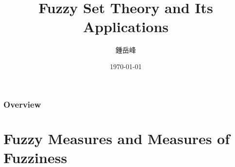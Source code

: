 \documentclass{beamer}
\begin{document}
\begin{CJK*}{UTF8}{bsmi}


\title[Fuzzy Set Theory]{Fuzzy Set Theory and Its Applications} %

\author{鍾岳峰} %
\date{\today} %



\begin{frame}
\titlepage %
\end{frame}

\begin{frame}
\frametitle{Overview} %
\tableofcontents %
\end{frame}


\section{Fuzzy Measures and Measures of Fuzziness} %


\end{CJK*}
\end{document}
